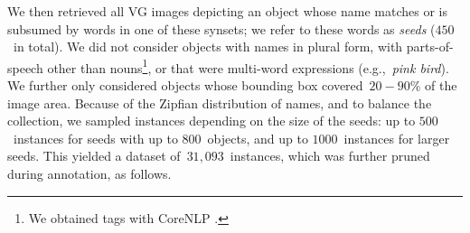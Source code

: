 We then retrieved all VG images depicting an object whose name matches or is subsumed by words in one of these synsets; we refer to these words as \textit{seeds} ($450$\ in total).
We did not consider objects with names in plural form, with parts-of-speech other than nouns\footnote{We obtained tags with CoreNLP \cite{manning2014stanford}.}, or that were multi-word expressions (e.g.,~\textsl{pink bird}). 
We further only considered objects whose bounding box covered~\mbox{$20-90\%$} of the image area.
Because of the Zipfian distribution of names, and to balance the collection, we sampled instances depending on the size of the seeds: up to $500$\ instances for seeds with up to $800$\ objects, and up to $1000$\ instances for larger seeds. This yielded a dataset of\ $31,093$~instances, which was further pruned during annotation, as follows.
